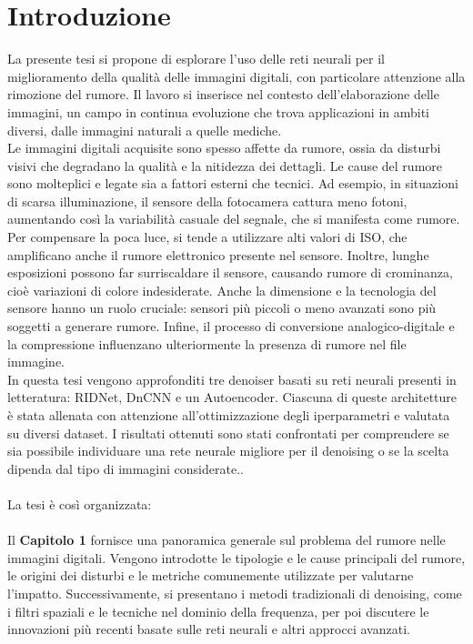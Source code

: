 \documentclass[12pt,a4paper,openright,twoside]{book}
\begin{document}
\chapter*{Introduzione}
\justifying %
La presente tesi si propone di esplorare l'uso delle reti neurali per il miglioramento della qualità delle immagini digitali, con particolare attenzione alla rimozione del rumore. Il lavoro si inserisce nel contesto dell'elaborazione delle immagini, un campo in continua evoluzione che trova applicazioni in ambiti diversi, dalle immagini naturali a quelle mediche.\\
Le immagini digitali acquisite sono spesso affette da rumore, ossia da disturbi visivi che degradano la qualità e la nitidezza dei dettagli. Le cause del rumore sono molteplici e legate sia a fattori esterni che tecnici. Ad esempio, in situazioni di scarsa illuminazione, il sensore della fotocamera cattura meno fotoni, aumentando così la variabilità casuale del segnale, che si manifesta come rumore. Per compensare la poca luce, si tende a utilizzare alti valori di ISO, che amplificano anche il rumore elettronico presente nel sensore. Inoltre, lunghe esposizioni possono far surriscaldare il sensore, causando rumore di crominanza, cioè variazioni di colore indesiderate. Anche la dimensione e la tecnologia del sensore hanno un ruolo cruciale: sensori più piccoli o meno avanzati sono più soggetti a generare rumore. Infine, il processo di conversione analogico-digitale e la compressione influenzano ulteriormente la presenza di rumore nel file immagine.\\
In questa tesi vengono approfonditi tre denoiser basati su reti neurali presenti in letteratura: RIDNet, DnCNN e un Autoencoder. Ciascuna di queste architetture è stata allenata con attenzione all'ottimizzazione degli iperparametri e valutata su diversi dataset. I risultati ottenuti sono stati confrontati per comprendere se sia possibile individuare una rete neurale migliore per il denoising o se la scelta dipenda dal tipo di immagini considerate..\\\\
La tesi è così organizzata:\\\\
Il \textbf{Capitolo 1} fornisce una panoramica generale sul problema del rumore nelle immagini digitali. Vengono introdotte le tipologie e le cause principali del rumore, le origini dei disturbi e le metriche comunemente utilizzate per valutarne l'impatto. Successivamente, si presentano i metodi tradizionali di denoising, come i filtri spaziali e le tecniche nel dominio della frequenza, per poi discutere le innovazioni più recenti basate sulle reti neurali e altri approcci avanzati.
\end{document}
